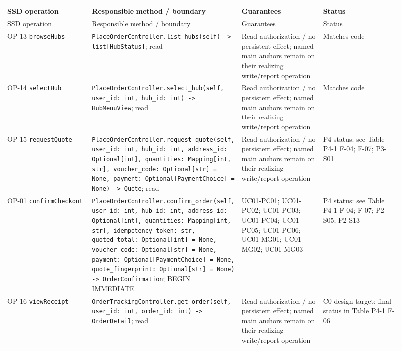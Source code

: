 \begin{longtable}{>{\raggedright\arraybackslash}p{0.2300\linewidth}>{\raggedright\arraybackslash}p{0.2300\linewidth}>{\raggedright\arraybackslash}p{0.2300\linewidth}>{\raggedright\arraybackslash}p{0.2300\linewidth}}
SSD operation & Responsible method / boundary & Guarantees & Status \\
\hline\endfirsthead
SSD operation & Responsible method / boundary & Guarantees & Status \\
\hline\endhead
OP-13 \texttt{browseHubs} & \texttt{PlaceOrderController.\allowbreak{}list\_\allowbreak{}hubs(self) -\textgreater{} list[HubStatus]}; read & Read authorization / no persistent effect; named main anchors remain on their realizing write/report operation & Matches code \\
OP-14 \texttt{selectHub} & \texttt{PlaceOrderController.\allowbreak{}select\_\allowbreak{}hub(self, user\_\allowbreak{}id: int, hub\_\allowbreak{}id: int) -\textgreater{} HubMenuView}; read & Read authorization / no persistent effect; named main anchors remain on their realizing write/report operation & Matches code \\
OP-15 \texttt{requestQuote} & \texttt{PlaceOrderController.\allowbreak{}request\_\allowbreak{}quote(self, user\_\allowbreak{}id: int, hub\_\allowbreak{}id: int, address\_\allowbreak{}id: Optional[int], quantities: Mapping[int, str], voucher\_\allowbreak{}code: Optional[str] = None, payment: Optional[PaymentChoice] = None) -\textgreater{} Quote}; read & Read authorization / no persistent effect; named main anchors remain on their realizing write/report operation & P4 status: see Table P4-1 F-04; F-07; P3-S01 \\
OP-01 \texttt{confirmCheckout} & \texttt{PlaceOrderController.\allowbreak{}confirm\_\allowbreak{}order(self, user\_\allowbreak{}id: int, hub\_\allowbreak{}id: int, address\_\allowbreak{}id: Optional[int], quantities: Mapping[int, str], idempotency\_\allowbreak{}token: str, quoted\_\allowbreak{}total: Optional[int] = None, voucher\_\allowbreak{}code: Optional[str] = None, payment: Optional[PaymentChoice] = None, quote\_\allowbreak{}fingerprint: Optional[str] = None) -\textgreater{} OrderConfirmation}; BEGIN IMMEDIATE & UC01-PC01; UC01-PC02; UC01-PC03; UC01-PC04; UC01-PC05; UC01-PC06; UC01-MG01; UC01-MG02; UC01-MG03 & P4 status: see Table P4-1 F-04; F-07; P2-S05; P2-S13 \\
OP-16 \texttt{viewReceipt} & \texttt{OrderTrackingController.\allowbreak{}get\_\allowbreak{}order(self, user\_\allowbreak{}id: int, order\_\allowbreak{}id: int) -\textgreater{} OrderDetail}; read & Read authorization / no persistent effect; named main anchors remain on their realizing write/report operation & C0 design target; final status in Table P4-1 F-06 \\

\end{longtable}
